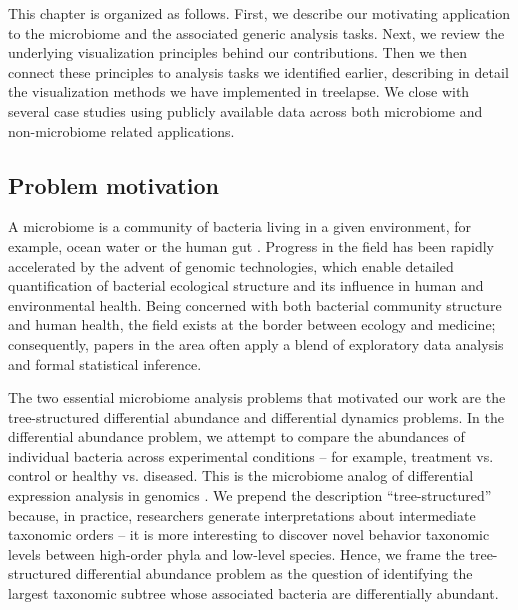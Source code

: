 This chapter is organized as follows. First, we describe our motivating application
to the microbiome and the associated generic analysis tasks. Next, we review the
underlying visualization principles behind our contributions. Then we then
connect these principles to analysis tasks we identified earlier, describing in
detail the visualization methods we have implemented in treelapse. We close with
several case studies using publicly available data across both microbiome and
non-microbiome related applications.

\subsection{Problem motivation}\label{problem-motivation}

A microbiome is a community of bacteria living in a given environment, for
example, ocean water or the human gut \citep{human2012structure, cho2012human}.
Progress in the field has been rapidly accelerated by the advent of genomic
technologies, which enable detailed quantification of bacterial ecological
structure and its influence in human and environmental health. Being concerned
with both bacterial community structure and human health, the field exists at
the border between ecology and medicine; consequently, papers in the area often
apply a blend of exploratory data analysis and formal statistical inference.

The two essential microbiome analysis problems that motivated our work are the
tree-structured differential abundance and differential dynamics problems. In
the differential abundance problem, we attempt to compare the abundances of
individual bacteria across experimental conditions -- for example, treatment vs.
control or healthy vs. diseased. This is the microbiome analog of differential
expression analysis in genomics \citep{anders2010differential}. We prepend the
description ``tree-structured'' because, in practice, researchers generate
interpretations about intermediate taxonomic orders -- it is more interesting to
discover novel behavior taxonomic levels between high-order phyla and low-level
species. Hence, we frame the tree-structured differential abundance problem as
the question of identifying the largest taxonomic subtree whose associated
bacteria are differentially abundant.

